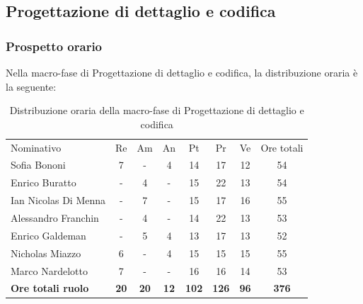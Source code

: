 \documentclass[../piano-di-progetto.tex]{subfiles}
\begin{document}
  \subsection{Progettazione di dettaglio e codifica}

  \subsubsection{Prospetto orario}
  Nella macro-fase di Progettazione di dettaglio e codifica, la distribuzione oraria è la seguente:
  \begin{table}[H]
    \centering
    \begin{tabular}{lccccccc}
      Nominativo                & Re          & Am          & An          & Pt           & Pr           & Ve          & Ore totali   \\
      Sofia Bononi              & 7           & -           & 4           & 14           & 17           & 12          & 54           \\
      Enrico Buratto            & -           & 4           & -           & 15           & 22           & 13          & 54           \\
      Ian Nicolas Di Menna      & -           & 7           & -           & 15           & 17           & 16          & 55           \\
      Alessandro Franchin       & -           & 4           & -           & 14           & 22           & 13          & 53           \\
      Enrico Galdeman           & -           & 5           & 4           & 13           & 17           & 13          & 52           \\
      Nicholas Miazzo           & 6           & -           & 4           & 15           & 15           & 15          & 55           \\
      Marco Nardelotto          & 7           & -           & -           & 16           & 16           & 14          & 53           \\
      \textbf{Ore totali ruolo} & \textbf{20} & \textbf{20} & \textbf{12} & \textbf{102} & \textbf{126} & \textbf{96} & \textbf{376}  
    \end{tabular}
    \caption{Distribuzione oraria della macro-fase di Progettazione di dettaglio e codifica}
  \end{table}
\end{document}
